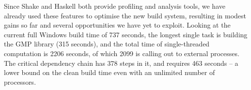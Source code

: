 Since Shake and Haskell both provide profiling and analysis tools, we have
already used these features to optimise the new build system, resulting in
modest gains so far and several opportunities we have yet to exploit. Looking at
the current full Windows build time of 737 seconds, the longest single task is
building the GMP library (315 seconds), and the total time of single-threaded
computation is 2206 seconds, of which 2099 is calling out to external processes.
The critical dependency chain has 378 steps in it, and requires 463 seconds -- a
lower bound on the clean build time even with an unlimited number of processors.

